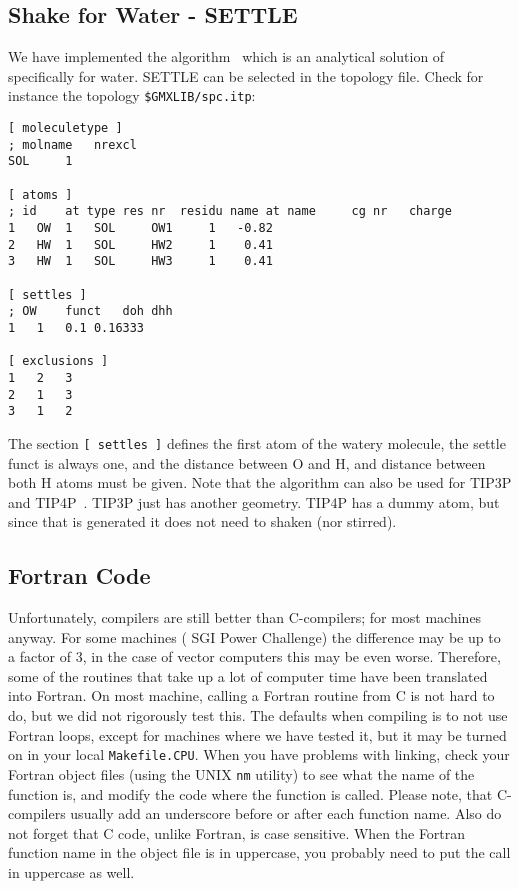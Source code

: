 \subsection{Shake for Water - SETTLE}
\label{sec:settle}
We have implemented the  algorithm~\cite{Miyamoto92} which is
an analytical solution of  specifically for water. 
SETTLE can be selected in the topology file. Check for instance the
topology {\tt \$GMXLIB/spc.itp}:
\begin{verbatim}
[ moleculetype ]
; molname	nrexcl
SOL		1

[ atoms ]
; id	at type	res nr 	residu name	at name		cg nr	charge
1	OW	1	SOL		OW1		1	-0.82
2	HW	1	SOL		HW2		1	 0.41
3	HW	1	SOL		HW3		1	 0.41

[ settles ]
; OW	funct	doh	dhh
1	1	0.1	0.16333

[ exclusions ]
1	2	3
2	1	3
3	1	2
\end{verbatim}
The section {\tt [ settles ]} defines the first atom of the watery molecule,
the settle funct is always one, and the distance between O and H, and distance
between both H atoms must be given. Note that the algorithm can also be used
for TIP3P and TIP4P~\cite{Jorgensen83}.
TIP3P just has another geometry. TIP4P has a dummy atom, but since 
that is generated it does not need to shaken (nor stirred).

\subsection{Fortran Code}
Unfortunately,  compilers are still better than C-compilers;
for most machines anyway. For some machines ({\eg} SGI Power Challenge)
the difference may be up to a factor of 3, in the case of vector
computers this may be even worse. Therefore, some of the routines
that take up a lot of computer time have been translated into Fortran.
On most machine, calling a Fortran routine from C is not hard to do,
but we did not rigorously test this. The defaults when compiling
{\gromacs} is to not use Fortran loops, except for machines where we
have tested it, but it may be turned on
in your local {\tt Makefile.CPU}. When you have problems with linking,
check your Fortran object files (using the UNIX {\tt nm} utility)
to see what the name of the function is, and modify the code where the
function is called. Please note, that C-compilers usually add an underscore
before or after each function name. Also do not forget that C code,
unlike Fortran, is case sensitive. When the Fortran function name in the
object file is in uppercase, you probably need to put the
call in uppercase as well. 

